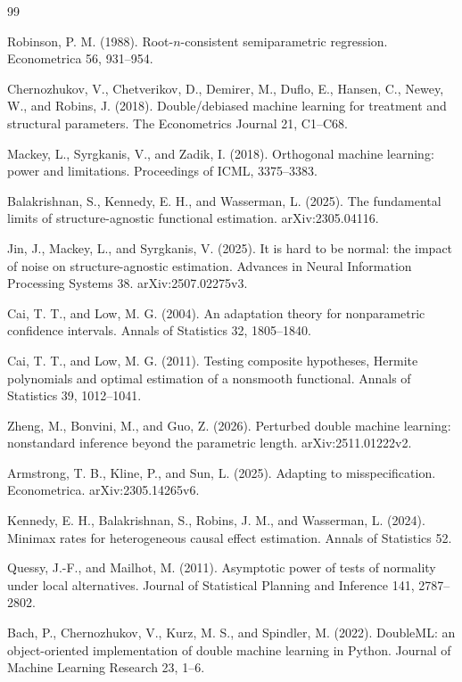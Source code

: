 \documentclass{article}
\begin{document}
\begin{thebibliography}{99}

   Robinson, P. M. (1988). Root-\(n\)-consistent semiparametric regression. Econometrica 56, 931--954.

   Chernozhukov, V., Chetverikov, D., Demirer, M., Duflo, E., Hansen, C., Newey, W., and Robins, J. (2018). Double/debiased machine learning for treatment and structural parameters. The Econometrics Journal 21, C1--C68.

   Mackey, L., Syrgkanis, V., and Zadik, I. (2018). Orthogonal machine learning: power and limitations. Proceedings of ICML, 3375--3383.

   Balakrishnan, S., Kennedy, E. H., and Wasserman, L. (2025). The fundamental limits of structure-agnostic functional estimation. arXiv:2305.04116.

   Jin, J., Mackey, L., and Syrgkanis, V. (2025). It is hard to be normal: the impact of noise on structure-agnostic estimation. Advances in Neural Information Processing Systems 38. arXiv:2507.02275v3.

   Cai, T. T., and Low, M. G. (2004). An adaptation theory for nonparametric confidence intervals. Annals of Statistics 32, 1805--1840.

   Cai, T. T., and Low, M. G. (2011). Testing composite hypotheses, Hermite polynomials and optimal estimation of a nonsmooth functional. Annals of Statistics 39, 1012--1041.

   Zheng, M., Bonvini, M., and Guo, Z. (2026). Perturbed double machine learning: nonstandard inference beyond the parametric length. arXiv:2511.01222v2.

   Armstrong, T. B., Kline, P., and Sun, L. (2025). Adapting to misspecification. Econometrica. arXiv:2305.14265v6.

   Kennedy, E. H., Balakrishnan, S., Robins, J. M., and Wasserman, L. (2024). Minimax rates for heterogeneous causal effect estimation. Annals of Statistics 52.

   Quessy, J.-F., and Mailhot, M. (2011). Asymptotic power of tests of normality under local alternatives. Journal of Statistical Planning and Inference 141, 2787--2802.

   Bach, P., Chernozhukov, V., Kurz, M. S., and Spindler, M. (2022). DoubleML: an object-oriented implementation of double machine learning in Python. Journal of Machine Learning Research 23, 1--6.

\end{thebibliography}
\end{document}
